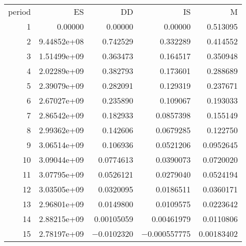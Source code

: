 \documentclass[11pt]{article}
\begin{document}
\begin{longtable}{rrrrr}
period &  ES &  DD &  IS &  M \\
1 & 0.00000 & 0.00000 & 0.00000 & 0.513095\\
2 & 9.44852\textrm{e+08} & 0.742529 & 0.332289 & 0.414552\\
3 & 1.51499\textrm{e+09} & 0.363473 & 0.164517 & 0.350948\\
4 & 2.02289\textrm{e+09} & 0.382793 & 0.173601 & 0.288689\\
5 & 2.39079\textrm{e+09} & 0.282091 & 0.129319 & 0.237671\\
6 & 2.67027\textrm{e+09} & 0.235890 & 0.109067 & 0.193033\\
7 & 2.86542\textrm{e+09} & 0.182933 & 0.0857398 & 0.155149\\
8 & 2.99362\textrm{e+09} & 0.142606 & 0.0679285 & 0.122750\\
9 & 3.06514\textrm{e+09} & 0.106936 & 0.0521206 & 0.0952645\\
10 & 3.09044\textrm{e+09} & 0.0774613 & 0.0390073 & 0.0720020\\
11 & 3.07795\textrm{e+09} & 0.0526121 & 0.0279040 & 0.0524194\\
12 & 3.03505\textrm{e+09} & 0.0320095 & 0.0186511 & 0.0360171\\
13 & 2.96801\textrm{e+09} & 0.0149800 & 0.0109575 & 0.0223642\\
14 & 2.88215\textrm{e+09} & 0.00105059 & 0.00461979 & 0.0110806\\
15 & 2.78197\textrm{e+09} & $-$0.0102320 & $-$0.000557775 & 0.00183402\\
\end{longtable}
\end{document}
